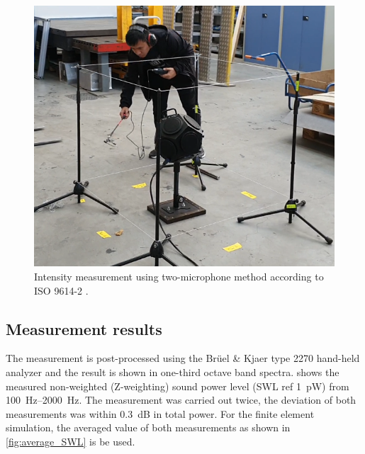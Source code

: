 \begin{figure}[H]
\begin{center}
\includegraphics[width=12cm]{fig/Sound_power_measurement_2.png}
\caption{Intensity measurement using two-microphone method according to ISO 9614-2 \cite{din19969614}.}
\label{fig:scanningmethod}
\end{center}
\end{figure}

\subsection*{Measurement results}

The measurement is post-processed using the Brüel \& Kjaer type 2270 hand-held analyzer and the result is shown in one-third octave band spectra.  shows the measured non-weighted (Z-weighting) sound power level (SWL ref \SI{1}{\pico\watt}) from \SIrange{100}{2000}{\hertz}. The measurement was carried out twice, the deviation of both measurements was  within \SI{0.3}{\dB} in total power. For the finite element simulation, the averaged value of both measurements as shown in \cref{fig:average_SWL} is be used.

